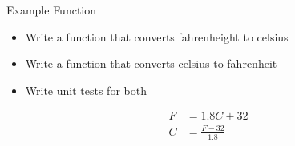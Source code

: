 \documentclass[11pt,professionalfonts]{beamer}
\begin{document}
\begin{frame}{Example Function}
    \begin{itemize}
        \item Write a function that converts fahrenheight to celsius
        \item Write a function that converts celsius to fahrenheit
        \item Write unit tests for both
    \end{itemize}

    \begin{align}
        F &= 1.8 C + 32 \\
        C &= \frac{F - 32}{1.8}
    \end{align}
\end{frame}
\end{document}

